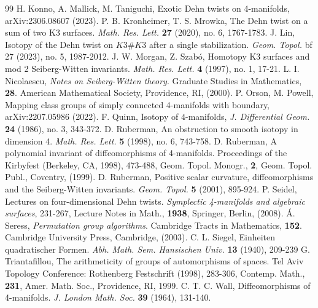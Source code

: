 \documentclass{amsart}
\theoremstyle{definition}
\theoremstyle{remark}
\numberwithin{equation}{section}
\begin{document}
\begin{thebibliography}{99}
H. Konno, A. Mallick, M. Taniguchi, Exotic Dehn twists on 4-manifolds, arXiv:2306.08607 (2023).
P. B. Kronheimer, T. S. Mrowka, The Dehn twist on a sum of two K3 surfaces. {\em Math. Res. Lett.} {\bf 27} (2020), no. 6, 1767-1783. 
J. Lin, Isotopy of the Dehn twist on $K3 \# K3$ after a single stabilization. {\em Geom. Topol.} {bf 27} (2023), no. 5, 1987-2012. 
J. W. Morgan, Z. Szab\'{o}, Homotopy K3 surfaces and mod 2 Seiberg-Witten invariants. {\em Math. Res. Lett.} {\bf 4} (1997), no. 1, 17-21. 
L. I. Nicolaescu, {\em Notes on Seiberg-Witten theory}. Graduate Studies in Mathematics, {\bf 28}. American Mathematical Society, Providence, RI, (2000).
P. Orson, M. Powell, Mapping class groups of simply connected 4-manifolds with boundary, arXiv:2207.05986 (2022).
F. Quinn, Isotopy of $4$-manifolds, {\em J. Differential Geom.} {\bf 24} (1986), no. 3, 343-372. 
D. Ruberman, An obstruction to smooth isotopy in dimension 4. {\em Math. Res. Lett.} {\bf 5} (1998), no. 6, 743-758. 
D. Ruberman, A polynomial invariant of diffeomorphisms of 4-manifolds. Proceedings of the Kirbyfest (Berkeley, CA, 1998), 473-488, Geom. Topol. Monogr., {\bf 2}, Geom. Topol. Publ., Coventry, (1999). 
D. Ruberman, Positive scalar curvature, diffeomorphisms and the Seiberg-Witten invariants. {\em Geom. Topol.} {\bf 5} (2001), 895-924. 
P. Seidel, Lectures on four-dimensional Dehn twists. {\em Symplectic 4-manifolds and algebraic surfaces}, 231-267, Lecture Notes in Math., {\bf 1938}, Springer, Berlin, (2008). 
\'{A}. Seress, {\em Permutation group algorithms}. Cambridge Tracts in Mathematics, {\bf 152}. Cambridge University Press, Cambridge, (2003).
C. L. Siegel, Einheiten quadratischer Formen. {\em Abh. Math. Sem. Hansischen Univ.} {\bf 13} (1940), 209-239
G. Triantafillou, The arithmeticity of groups of automorphisms of spaces. Tel Aviv Topology Conference: Rothenberg Festschrift (1998), 283-306, Contemp. Math., {\bf 231}, Amer. Math. Soc., Providence, RI, 1999. 
C. T. C. Wall, Diffeomorphisms of 4-manifolds. {\em J. London Math. Soc.} {\bf 39} (1964), 131-140. 
\end{thebibliography}
\end{document}
